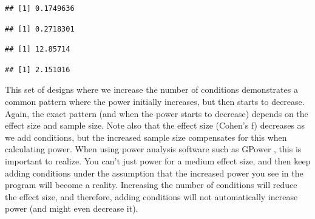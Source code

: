 \documentclass[]{book}
\newenvironment{Shaded}{\begin{snugshade}}{\end{snugshade}}
\newcommand{\KeywordTok}[1]{\textcolor[rgb]{0.13,0.29,0.53}{\textbf{#1}}}
\newcommand{\NormalTok}[1]{#1}
\newcommand{\OperatorTok}[1]{\textcolor[rgb]{0.81,0.36,0.00}{\textbf{#1}}}
\begin{document}
\begin{verbatim}
## [1] 0.1749636
\end{verbatim}

\begin{Shaded}
\end{Shaded}

\begin{verbatim}
## [1] 0.2718301
\end{verbatim}

\begin{Shaded}
\end{Shaded}

\begin{verbatim}
## [1] 12.85714
\end{verbatim}

\begin{Shaded}
\end{Shaded}

\begin{verbatim}
## [1] 2.151016
\end{verbatim}

This set of designs where we increase the number of conditions demonstrates a common pattern where the power initially increases, but then starts to decrease. Again, the exact pattern (and when the power starts to decrease) depends on the effect size and sample size. Note also that the effect size (Cohen's f) decreases as we add conditions, but the increased sample size compensates for this when calculating power. When using power analysis software such as GPower \citep{faul2007g}, this is important to realize. You can't just power for a medium effect size, and then keep adding conditions under the assumption that the increased power you see in the program will become a reality. Increasing the number of conditions will reduce the effect size, and therefore, adding conditions will not automatically increase power (and might even decrease it).
\end{document}
